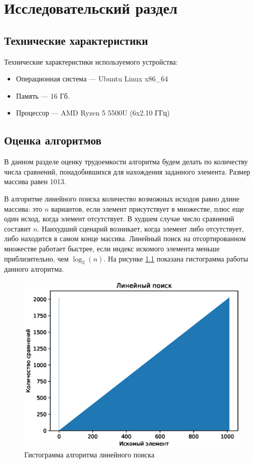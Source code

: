 \chapter{Исследовательский раздел}

\section{Технические характеристики}
Технические характеристики используемого устройства:
\begin{itemize}
    \item Операционная система --- Ubuntu Linux x86\_64 \cite{Ubuntu}
    \item Память --- 16 Гб.
    \item Процессор --- AMD Ryzen 5 5500U (6x2.10 ГГц) \cite{AMD}
\end{itemize}

\section{Оценка алгоритмов}
В данном разделе оценку трудоемкости алгоритма будем делать по количеству числа сравнений, понадобившихся для нахождения заданного элемента. Размер массива равен 1013.

В алгоритме линейного поиска количество возможных исходов равно длине массива: это $n$ вариантов, если элемент присутствует в множестве, плюс еще один исход, когда элемент отсутствует. В худшем случае число сравнений составит $n$. Наихудший сценарий возникает, когда элемент либо отсутствует, либо находится в самом конце массива. Линейный поиск на отсортированном множестве работает быстрее, если индекс искомого элемента меньше приблизительно, чем $\log_2(n)$. На рисунке \ref{fig:Gist_Liniar} показана гистограмма работы данного алгоритма.

\begin{figure}[h]
	\centering
	\includegraphics[]{img/Figure_1.eps}
	\caption{Гистограмма алгоритма линейного поиска}
	\label{fig:Gist_Liniar}
\end{figure}

